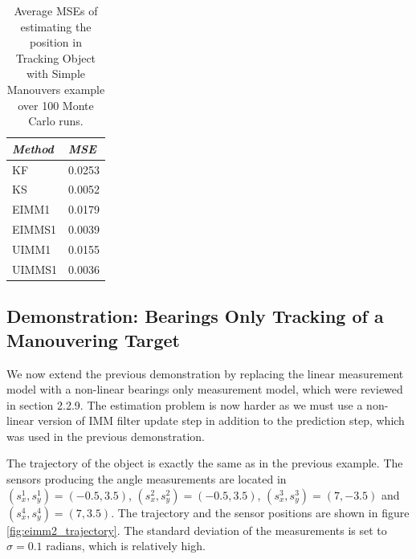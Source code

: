 %  
\begin{table}
\begin{center}
\begin{tabular}{|l|l|} \hline {\it Method}&{\it MSE } \\ \hline KF &
0.0253 \\ KS & 0.0052 \\ EIMM1 & 0.0179 \\ EIMMS1 & 0.0039 \\ UIMM1 &
0.0155 \\ UIMMS1 & 0.0036 \\ \hline
\end{tabular}
\caption{Average MSEs of estimating the position in Tracking Object
with Simple Manouvers example over 100 Monte Carlo runs.}
\label{table:eimm1_mse}
\end{center}
\end{table}
%

\subsection{Demonstration: Bearings Only Tracking of a Manouvering
Target}

We now extend the previous demonstration by replacing the linear
measurement model with a non-linear bearings only measurement model,
which were reviewed in section 2.2.9. The estimation problem is now
harder as we must use a non-linear version of IMM filter update step
in addition to the prediction step, which was used in the previous
demonstration.

The trajectory of the object is exactly the same as in the previous
example. The sensors producing the angle measurements are located in
$(s_x^1,s_y^1) = (-0.5,3.5)$, $(s_x^2,s_y^2) = (-0.5,3.5)$,
$(s_x^3,s_y^3) = (7,-3.5)$ and $(s_x^4,s_y^4) = (7,3.5)$. The
trajectory and the sensor positions are shown in figure
\ref{fig:eimm2_trajectory}.  The standard deviation of the
measurements is set to $\sigma = 0.1$ radians, which is relatively
high.

